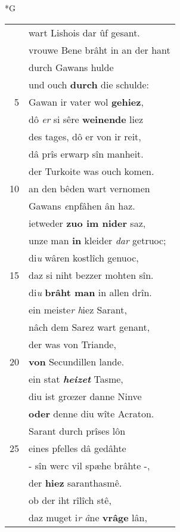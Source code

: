 \documentclass[8pt,a4paper,notitlepage]{article}
\begin{document}
\begin{table}[ht]
\begin{minipage}[t]{0.5\linewidth}
\small
\begin{center}*G
\end{center}
\begin{tabular}{rl}
 & wart Lishois dar ûf gesant.\\ 
 & vrouwe Bene brâht in an der hant\\ 
 & durch Gawans hulde\\ 
 & und ouch \textbf{durch} die schulde:\\ 
5 & Gawan ir vater wol \textbf{gehiez},\\ 
 & dô \textit{er} si sêre \textbf{weinende} liez\\ 
 & des tages, dô er von ir reit,\\ 
 & dâ prîs erwarp sîn manheit.\\ 
 & der Turkoite was ouch komen.\\ 
10 & an den bêden wart vernomen\\ 
 & Gawans \textit{e}npfâhen ân haz.\\ 
 & ietweder \textbf{zuo im nider} saz,\\ 
 & unze man \textbf{in} kleider \textit{dar} getruoc;\\ 
 & di\textit{u} wâren kostlîch genuoc,\\ 
15 & daz si niht bezzer mohten sîn.\\ 
 & di\textit{u} \textbf{brâht man} in allen drîn.\\ 
 & ein meiste\textit{r} \textit{h}iez Sarant,\\ 
 & nâch dem Sarez wart genant,\\ 
 & der was von Triande,\\ 
20 & \textbf{von} Secundillen lande.\\ 
 & ein stat \textit{\textbf{heizet}} Tasme,\\ 
 & diu ist grœzer danne Ninve\\ 
 & \textbf{oder} denne diu wîte Acraton.\\ 
 & Sarant durch prîses lôn\\ 
25 & eines pfelles dâ gedâhte\\ 
 & - sîn werc vil spæhe brâhte -,\\ 
 & der \textbf{hiez} saranthasmê.\\ 
 & ob der iht rîlîch stê,\\ 
 & daz muget i\textit{r} \textit{â}ne \textbf{vrâge} lân,\\ 

\end{tabular}
\end{minipage}
\end{table}
\end{document}
